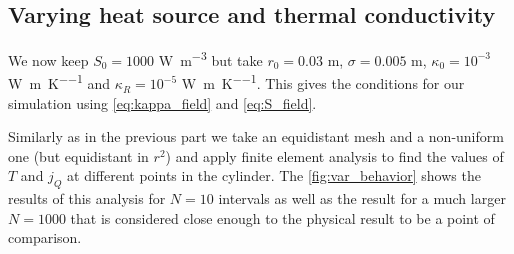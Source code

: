\subsection{Varying heat source and thermal conductivity}
We now keep $S_0 = 1000$ \si{\watt\per\cubic\meter} but take $r_0 = 0.03$ \si{\meter}, $\sigma = 0.005$ \si{\meter}, $\kappa_0 = 10^{-3}$ \si{\watt\per\meter\per\kelvin} and $\kappa_R = 10^{-5}$ \si{\watt\per\meter\per\kelvin}. This gives the conditions for our simulation using \autoref{eq:kappa_field} and \autoref{eq:S_field}. 

Similarly as in the previous part we take an equidistant mesh and a non-uniform one (but equidistant in $r^2$) and apply finite element analysis to find the values of $T$ and $j_Q$ at different points in the cylinder. The \autoref{fig:var_behavior} shows the results of this analysis for $N=10$ intervals as well as the result for a much larger $N=1000$ that is considered close enough to the physical result to be a point of comparison.

